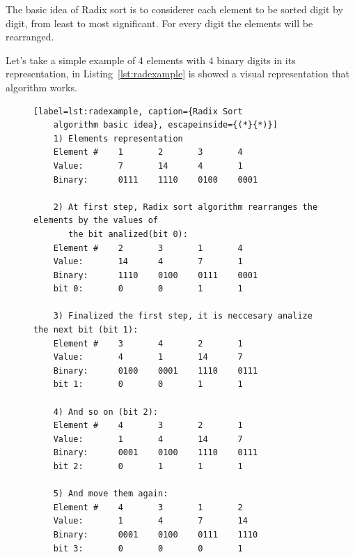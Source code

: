 \documentclass[Ingles]{ic-tese-v1}
\newcommand{\rlst}[1]{Listing~\ref{lst:#1}}
\begin{document}
The basic idea of Radix sort is to considerer each element to be sorted digit
by digit, from least to most significant. For every digit the elements will 
be rearranged.

Let's take a simple example of 4 elements with 4 binary digits in its 
representation, in \rlst{radexample} is showed a visual representation that algorithm works.
\begin{figure}[t]
	\lstset{basicstyle=\scriptsize}
	\begin{lstlisting}[label=lst:radexample, caption={Radix Sort
	algorithm basic idea}, escapeinside={(*}{*)}]
	1) Elements representation
	Element #    1       2       3       4
	Value:       7       14      4       1
	Binary:      0111    1110    0100    0001
	
	2) At first step, Radix sort algorithm rearranges the elements by the values of
	   the bit analized(bit 0):
	Element #    2       3       1       4
	Value:       14      4       7       1
	Binary:      1110    0100    0111    0001
	bit 0:       0       0       1       1
	
	3) Finalized the first step, it is neccesary analize the next bit (bit 1):
	Element #    3       4       2       1
	Value:       4       1       14      7
	Binary:      0100    0001    1110    0111
	bit 1:       0       0       1       1
	
	4) And so on (bit 2):
	Element #    4       3       2       1
	Value:       1       4       14      7
	Binary:      0001    0100    1110    0111
	bit 2:       0       1       1       1
	
	5) And move them again:
	Element #    4       3       1       2
	Value:       1       4       7       14
	Binary:      0001    0100    0111    1110
	bit 3:       0       0       0       1	
	
	\end{lstlisting}
\end{figure}
\end{document}
